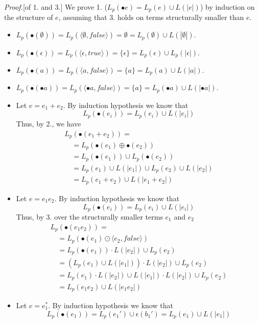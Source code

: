 \documentclass[preprint]{sigplanconf}
\newcommand{\true}{\mathit{true}}
\newcommand{\false}{\mathit{false}}
\newcommand{\Le}[1]{L(#1)}
\newcommand{\Lp}[1]{L_p(#1)}
\newcounter{item}
\newenvironment{proof}{\begin{trivlist}\item[]{\em Proof.}}{\end{trivlist}}
\begin{document}
\begin{proof}[of 1. and 3.]
We prove 1. ($\Lp{\bullet e} = \Lp e \cup \Le{|e|}$) by induction on the structure
of $e$, assuming that 3. holds on terms structurally smaller than $e$.
\begin{itemize}
\item $\Lp{\bullet(\emptyset)} = \Lp{\langle \emptyset, \false \rangle} 
= \emptyset = \Lp{\emptyset} \cup \Le{|\emptyset|}$.
\item $\Lp{\bullet(\epsilon)} = \Lp{\langle \epsilon, \true \rangle} 
= \{\epsilon\} = \Lp{\epsilon} \cup \Lp{|\epsilon|}$.
\item $\Lp{\bullet(a)} = \Lp{\langle a, \false \rangle} 
= \{a\} = \Lp{a} \cup \Le{|a|}$.
\item $\Lp{\bullet(\bullet a)} = \Lp{\langle \bullet a, \false \rangle} 
= \{a\} = \Lp{\bullet a} \cup \Le{|\bullet a|}$.
\item Let $e = e_1 + e_2$. By induction hypothesis we know that 
\[\Lp{\bullet(e_i)} = \Lp{e_i} \cup \Le{|e_i|}\]
Thus, by 2., we have
\[\begin{array}{l}
L_p(\bullet(e_1+e_2)) =\\
\quad = L_p(\bullet(e_1) \oplus \bullet(e_2)) \\
\quad = L_p(\bullet(e_1)) \cup L_p(\bullet(e_2)) \\
\quad = \Lp{e_1} \cup \Le{|e_1|} \cup \Lp{e_2} \cup \Le{|e_2|} \\
\quad = \Lp{e_1 + e_2} \cup \Le{|e_1 + e_2|}
\end{array}
\]
\item Let $e=e_1e_2$. By induction hypothesis we know that 
\[\Lp{\bullet(e_i)} = \Lp{e_i} \cup \Le{|e_i|}\]
Thus, by 3. over the structurally smaller terms $e_1$ and $e_2$
\[\begin{array}{l}
L_p(\bullet(e_1e_2)) =\\
\quad = L_p(\bullet(e_1) \odot \langle e_2,\false \rangle) \\
\quad = L_p(\bullet(e_1)) \cdot \Le{|e_2|} \cup L_p(e_2) \\
\quad = (L_p(e_1) \cup L(|e_1|)) \cdot \Le{|e_2|} \cup L_p(e_2) \\
\quad = L_p(e_1) \cdot L(|e_2|) \cup L(|e_1|) \cdot L(|e_2|) \cup L_p(e_2)\\
\quad = L_p(e_1e_2) \cup L(|e_1e_2|)
\end{array}
\]
\item Let $e=e_1^*$. By induction hypothesis we know that 
\[\Lp{\bullet(e_1)} = \Lp{e_1'} \cup \epsilon(b_1') = \Lp{e_1} \cup \Le{|e_1|}\]

\end{itemize}
\end{proof}
\end{document}
